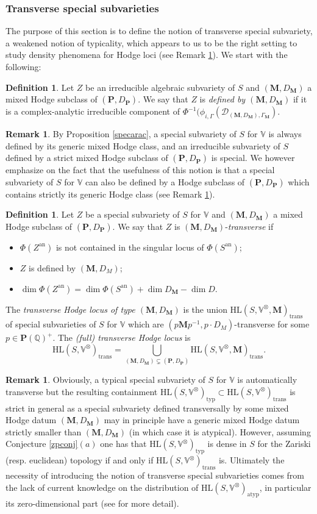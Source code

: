 \documentclass[10pt]{article}
\numberwithin{equation}{subsection}
\theoremstyle{plain}
\theoremstyle{definition}
\newtheorem{definition}[theorem]{Definition}
\newtheorem{remark}[theorem]{Remark}
\theoremstyle{remark}
\newcommand{\Q}{\mathbb Q}
\newcommand{\V}{\mathbb V}
\newcommand{\pp}{\mathbf P}
\newcommand{\M}{\mathbf M}
\newcommand{\HL}{\mathrm{HL}(S, \V^\otimes)}
\newcommand{\HLM}{\mathrm{HL}(S, \V^\otimes, \M)}
\newcommand{\an}{\mathrm{an}}
\newcommand{\period}{\mathscr{D}}
\newcommand{\typ}{\mathrm{typ}}
\newcommand{\atyp}{\mathrm{atyp}}
\newcommand{\trans}{\mathrm{trans}}
\begin{document}
\subsubsection*{Transverse special subvarieties}
The purpose of this section is to define the notion of transverse special subvariety, a weakened notion of typicality, which appears to us to be the right setting to study density phenomena for Hodge loci (see Remark \ref{typtrans}). We start with the following:
\begin{definition}
Let $Z$ be an irreducible algebraic subvariety of $S$ and $(\M,D_\M)$ a mixed Hodge subclass of $(\pp, D_\pp)$. We say that $Z$ is \textit{defined by $(\M, D_\M)$} if it is a complex-analytic irreducible component of $\Phi^{-1}(\phi_{i, \Gamma}(\period_{(\M,D_\M), \Gamma_\M})$.
\end{definition}
\begin{remark}\label{defgen}
By Proposition \ref{specarac}, a special subvariety of $S$ for $\V$ is always defined by its generic mixed Hodge class, and an irreducible subvariety of $S$ defined by a strict mixed Hodge subclass of $(\pp,D_\pp)$ is special. We however emphasize on the fact that the usefulness of this notion is that a special subvariety of $S$ for $\V$ can also be defined by a Hodge subclass of $(\pp,D_\pp)$ which contains strictly its generic Hodge class (see Remark \ref{typtrans}).
\end{remark}
\begin{definition}\label{deftrans}
Let $Z$ be a special subvariety of $S$ for $\V$ and $(\M, D_\M)$ a mixed Hodge subclass of $(\pp, D_\pp)$. We say that $Z$ is $(\M,D_\M)$-\textit{transverse} if 
\begin{itemize}
\item $\Phi(Z^\an)$ is not contained in the singular locus of $\Phi(S^\an)$;
\item $Z$ is defined by $(\M,D_M)$;
\item $\dim \Phi(Z^\an) = \dim \Phi(S^\an) + \dim D_\M - \dim D$.
\end{itemize}
The \textit{transverse Hodge locus of type $(\M,D_\M)$} is the union $\HLM_\trans$ of special subvarieties of $S$ for $\V$ which are $(p\M p^{-1},p \cdot D_M)$-transverse for some $p \in \pp(\Q)^+$. The \textit{(full) transverse Hodge locus} is
\[
\HL_\trans = \bigcup_{(\M,D_\M) \subsetneq (\pp, D_\pp)} \HLM_\trans.
\]
\end{definition}
\begin{remark}\label{typtrans}
Obviously, a typical special subvariety of $S$ for $\V$ is automatically transverse but the resulting containment $\HL_\typ \subset \HL_\trans$ is strict in general as a special subvariety defined transversally by some mixed Hodge datum $(\M,D_\M)$ may in principle have a generic mixed Hodge datum strictly smaller than $(\M,D_\M)$ (in which case it is atypical). However, assuming Conjecture \ref{zpconj}$(a)$ one has that $\HL_\typ$ is dense in $S$ for the Zariski (resp. euclidean) topology if and only if $\HL_\trans$ is. Ultimately the necessity of introducing the notion of transverse special subvarieties comes from the lack of current knowledge on the distribution of $\HL_\atyp$, in particular its zero-dimensional part (see \cite{bu} for more detail).
\end{remark}
\end{document}
